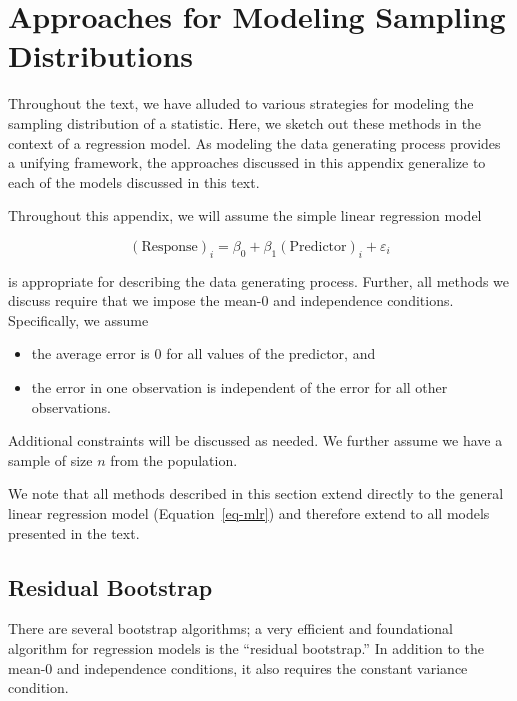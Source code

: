 \documentclass[
  letterpaper,
  DIV=11,
  numbers=noendperiod]{scrreprt}
\providecommand{\tightlist}{%
  \setlength{\itemsep}{0pt}\setlength{\parskip}{0pt}}\usepackage{longtable,booktabs,array}
\theoremstyle{plain}
\theoremstyle{definition}
\theoremstyle{definition}
\theoremstyle{remark}
\begin{document}
\cleardoublepage
{}
{}
\appendix

\hypertarget{sec-app-theory}{%
\chapter{Approaches for Modeling Sampling
Distributions}\label{sec-app-theory}}

Throughout the text, we have alluded to various strategies for modeling
the sampling distribution of a statistic. Here, we sketch out these
methods in the context of a regression model. As modeling the data
generating process provides a unifying framework, the approaches
discussed in this appendix generalize to each of the models discussed in
this text.

Throughout this appendix, we will assume the simple linear regression
model

\[(\text{Response})_i = \beta_0 + \beta_1 (\text{Predictor})_i + \varepsilon_i\]

is appropriate for describing the data generating process. Further, all
methods we discuss require that we impose the mean-0 and independence
conditions. Specifically, we assume

\begin{itemize}
\tightlist
\item
  the average error is 0 for all values of the predictor, and
\item
  the error in one observation is independent of the error for all other
  observations.
\end{itemize}

Additional constraints will be discussed as needed. We further assume we
have a sample of size \(n\) from the population.

We note that all methods described in this section extend directly to
the general linear regression model (Equation~\ref{eq-mlr}) and
therefore extend to all models presented in the text.

\hypertarget{residual-bootstrap}{%
\section{Residual Bootstrap}\label{residual-bootstrap}}

There are several bootstrap algorithms; a very efficient and
foundational algorithm for regression models is the ``residual
bootstrap.'' In addition to the mean-0 and independence conditions, it
also requires the constant variance condition.
\end{document}
